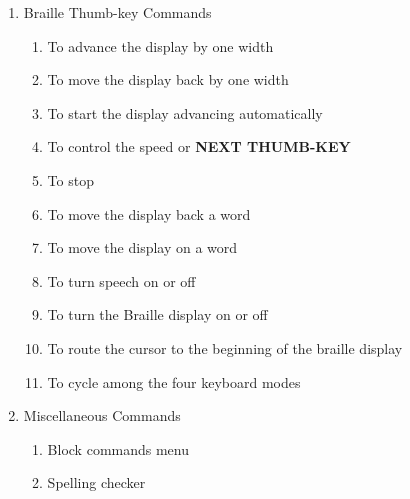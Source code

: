 \documentclass[10pt,letterpaper,twoside]{report}
\begin{document}
{{{\begin{enumerate}
\begin{enumerate}
			\item To enter or leave review-only mode 
		\end{enumerate}
	\item Braille Thumb-key Commands
		\begin{enumerate}
			\item To advance the display by one width
			\item To move the display back by one width
			\item To start the display advancing automatically 
			\item To control the speed  or {\textcolor{accent}{\MakeUppercase{\textbf{next thumb-key}}}}
			\item To stop 
			\item To move the display back a word  
			\item To move the display on a word  
			\item To turn speech on or off  
			\item To turn the Braille display on or off  
			\item To route the cursor to the beginning of the braille display  
			\item To cycle among the four keyboard modes 
		\end{enumerate}
	\item Miscellaneous Commands
	\begin{enumerate}
		\item Block commands menu  
		\item Spelling checker  

\end{enumerate}
\end{enumerate}}}}
\end{document}
